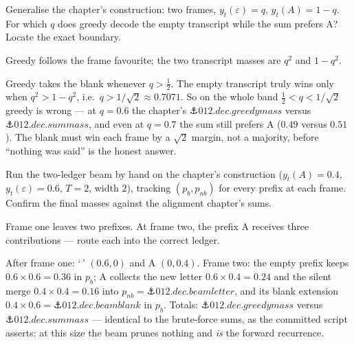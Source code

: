 \begin{problem}
Generalise the chapter's construction: two frames, $y_t(\varepsilon)
= q$, $y_t(A) = 1 - q$. For which $q$ does greedy decode the empty
transcript while the sum prefers A? Locate the exact boundary.
\begin{hint}
Greedy follows the frame favourite; the two transcript masses are
$q^2$ and $1 - q^2$.
\end{hint}
\begin{solution}
Greedy takes the blank whenever $q > \tfrac12$. The empty transcript
truly wins only when $q^2 > 1 - q^2$, i.e.\ $q > 1/\sqrt{2} \approx
0.7071$. So on the whole band $\tfrac12 < q < 1/\sqrt{2}$ greedy is
wrong — at $q = 0.6$ the chapter's $\anchor{012.dec.greedymass}$
versus $\anchor{012.dec.summass}$, and even at $q = 0.7$ the sum
still prefers A ($0.49$ versus $0.51$). The blank must win each frame
by a $\sqrt{2}$ margin, not a majority, before ``nothing was said''
is the honest answer.
\end{solution}
\end{problem}

\begin{problem}
Run the two-ledger beam by hand on the chapter's construction
($y_t(A) = 0.4$, $y_t(\varepsilon) = 0.6$, $T = 2$, width $2$),
tracking $(p_b, p_{nb})$ for every prefix at each frame. Confirm the
final masses against the alignment chapter's sums.
\begin{hint}
Frame one leaves two prefixes. At frame two, the prefix A receives
three contributions — route each into the correct ledger.
\end{hint}
\begin{solution}
After frame one: `\,' $(0.6, 0)$ and A $(0, 0.4)$. Frame two: the
empty prefix keeps $0.6 \times 0.6 = 0.36$ in $p_b$; A collects the
new letter $0.6 \times 0.4 = 0.24$ and the silent merge
$0.4 \times 0.4 = 0.16$ into $p_{nb} = \anchor{012.dec.beamletter}$,
and its blank extension $0.4 \times 0.6 = \anchor{012.dec.beamblank}$
in $p_b$. Totals: $\anchor{012.dec.greedymass}$ versus
$\anchor{012.dec.summass}$ — identical to the brute-force sums, as
the committed script asserts: at this size the beam prunes nothing
and \emph{is} the forward recurrence.
\end{solution}
\end{problem}

